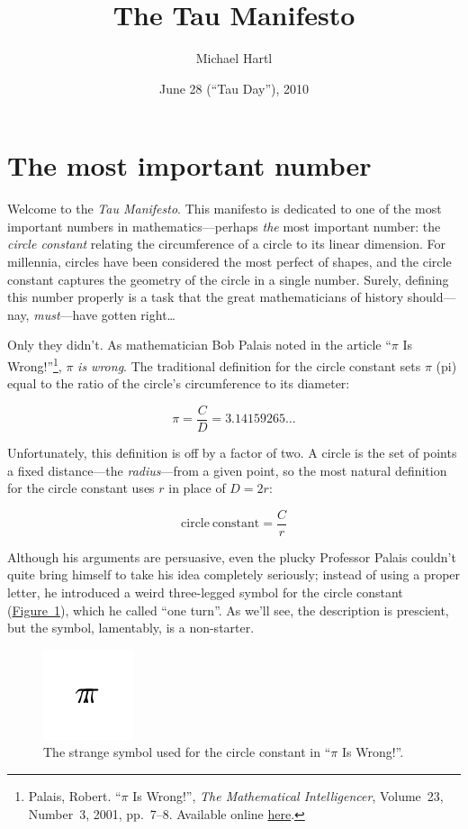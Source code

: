 \documentclass{article}
\begin{document}
\title{The Tau Manifesto}
\author{Michael Hartl}
\date{June 28 (``Tau Day''), 2010}
\maketitle

\section{The most important number} %
\label{sec:the_most_important_number}

Welcome to the \emph{Tau Manifesto}. This manifesto is dedicated to one of the most important numbers in mathematics---perhaps \emph{the} most important number: the \emph{circle constant} relating the circumference of a circle to its linear dimension. For millennia, circles have been considered the most perfect of shapes, and the circle constant captures the geometry of the circle in a single number. Surely, defining this number properly is a task that the great mathematicians of history should---nay, \emph{must}---have gotten right\ldots

Only they didn't.  As mathematician Bob Palais noted in the article ``$\pi$ Is Wrong!''\footnote{Palais, Robert. ``$\pi$ Is Wrong!'', \emph{The Mathematical Intelligencer}, Volume~23, Number~3, 2001, pp.~7--8. Available online \href{http://www.math.utah.edu/~palais/pi.html}{here}.}, $\pi$ \emph{is wrong}. The traditional definition for the circle constant sets $\pi$ (pi) equal to the ratio of the circle's circumference to its diameter:


\[
  \pi = \frac{C}{D} = 3.14159265\ldots
\]

\noindent Unfortunately, this definition is off by a factor of two. A circle is the set of points a fixed distance---the \emph{radius}---from a given point, so the most natural definition for the circle constant uses $r$ in place of $D = 2r$:

\[
  \mathrm{circle\ constant} = \frac{C}{r}
\]

Although his arguments are persuasive, even the plucky Professor Palais couldn't quite bring himself to take his idea completely seriously; instead of using a proper letter, he introduced a weird three-legged symbol for the circle constant (\hyperref[fig:palais-tau]{Figure~}\ref{fig:palais-tau}), which he called ``one turn''. As we'll see, the description is prescient, but the symbol, lamentably, is a non-starter.


\begin{figure}
\begin{center}
\includegraphics{images/figures/palais-tau.png}
\end{center}
\caption{The strange symbol used for the circle constant in ``$\pi$ Is Wrong!''.\label{fig:palais-tau}}
\end{figure}
\end{document}
